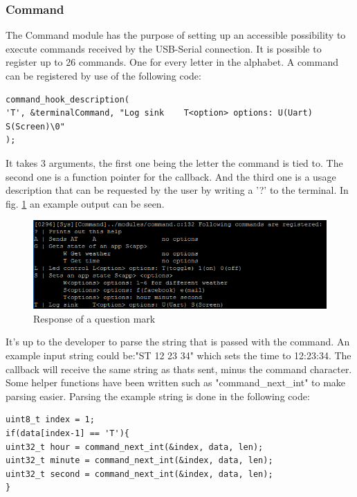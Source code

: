 \subsubsection{Command}
The Command module has the purpose of setting up an accessible possibility to execute commands received by the USB-Serial connection. It is possible to register up to 26 commands. One for every letter in the alphabet. A command can be registered by use of the following code:
\begin{verbatim}
command_hook_description(
'T', &terminalCommand, "Log sink    T<option> options: U(Uart) S(Screen)\0"
);
\end{verbatim}
It takes 3 arguments, the first one being the letter the command is tied to. The second one is a function pointer for the callback. And the third one is a usage description that can be requested by the user by writing a '?' to the terminal. In fig. \ref{fig:command_usage} an example output can be seen.
\begin{figure}[H]
	\centering
	\label{fig:command_usage}
	\includegraphics[width=1\textwidth]{./fig/command_usage.png}
	\caption{Response of a question mark}
\end{figure}
It's up to the developer to parse the string that is passed with the command. An example input string could be:"ST 12 23 34" which sets the time to 12:23:34. The callback will receive the same string as thats sent, minus the command character. Some helper functions have been written such as "command\_next\_int" to make parsing easier. Parsing the example string is done in the following code:
\begin{verbatim}
uint8_t index = 1;
if(data[index-1] == 'T'){
uint32_t hour = command_next_int(&index, data, len);
uint32_t minute = command_next_int(&index, data, len);
uint32_t second = command_next_int(&index, data, len);
}
\end{verbatim}
